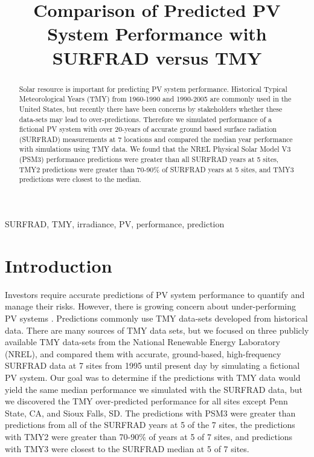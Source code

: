\documentclass[conference]{IEEEtran}
\begin{document}
\title{Comparison of Predicted PV System Performance with SURFRAD versus TMY}

\author{
	}

\maketitle

\begin{abstract}
Solar resource is important for predicting PV system performance. Historical Typical Meteorological Years (TMY) from 1960-1990 and 1990-2005 are commonly used in the United States, but recently there have been concerns by stakeholders whether these data-sets may lead to over-predictions. Therefore we simulated performance of a fictional PV system with over 20-years of accurate ground based surface radiation (SURFRAD) measurements at 7 locations and compared the median year performance with simulations using TMY data. We found that the NREL Physical Solar Model V3 (PSM3) performance predictions were greater than all SURFRAD years at 5 sites, TMY2 predictions were greater than 70-90\% of SURFRAD years at 5 sites, and TMY3 predictions were closest to the median.
\end{abstract}

\begin{IEEEkeywords}
SURFRAD, TMY, irradiance, PV, performance, prediction
\end{IEEEkeywords}

\section{Introduction}
Investors require accurate predictions of PV system performance to quantify and manage their risks. However, there is growing concern about under-performing PV systems \cite{Matsui2020}. Predictions commonly use TMY data-sets developed from historical data. There are many sources of TMY data sets, but we focused on three publicly available TMY data-sets from the National Renewable Energy Laboratory (NREL), and compared them with accurate, ground-based, high-frequency SURFRAD data at 7 sites from 1995 until present day \cite{Augustine2000} by simulating a fictional PV system. Our goal was to determine if the predictions with TMY data would yield the same median performance we simulated with the SURFRAD data, but we discovered the TMY over-predicted performance for all sites except Penn State, CA, and Sioux Falls, SD. The predictions with PSM3 were greater than predictions from all of the SURFRAD years at 5 of the 7 sites, the predictions with TMY2 were greater than 70-90\% of years at 5 of 7 sites, and predictions with TMY3 were closest to the SURFRAD median at 5 of 7 sites.
\end{document}

